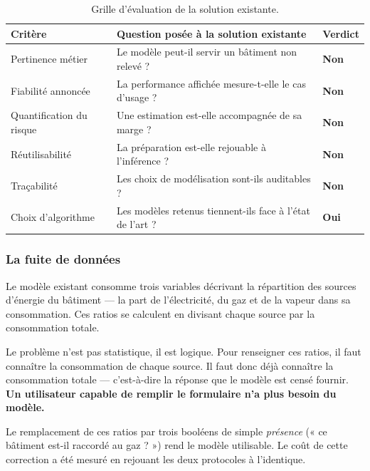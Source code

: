 \begin{table}[H]
\centering
\small
\begin{tabularx}{\linewidth}{@{}L{3.4cm}XL{2.5cm}@{}}
\toprule
\textbf{Critère} & \textbf{Question posée à la solution existante} & \textbf{Verdict} \\
\midrule
Pertinence métier & Le modèle peut-il servir un bâtiment non relevé ? & \textbf{Non} \\
Fiabilité annoncée & La performance affichée mesure-t-elle le cas d'usage ? & \textbf{Non} \\
Quantification du risque & Une estimation est-elle accompagnée de sa marge ? & \textbf{Non} \\
Réutilisabilité & La préparation est-elle rejouable à l'inférence ? & \textbf{Non} \\
Traçabilité & Les choix de modélisation sont-ils auditables ? & \textbf{Non} \\
Choix d'algorithme & Les modèles retenus tiennent-ils face à l'état de l'art ? & \textbf{Oui} \\
\bottomrule
\end{tabularx}
\caption{Grille d'évaluation de la solution existante.}
\end{table}

\subsubsection{La fuite de données}
\label{sec:fuite}

Le modèle existant consomme trois variables décrivant la répartition des sources
d'énergie du bâtiment — la part de l'électricité, du gaz et de la vapeur dans sa
consommation. Ces ratios se calculent en divisant chaque source par la
consommation totale.

\begin{constat}{Le problème n'est pas statistique, il est logique.}
Pour renseigner ces ratios, il faut connaître la consommation de chaque source.
Il faut donc déjà connaître la consommation totale — c'est-à-dire la réponse que
le modèle est censé fournir. \textbf{Un utilisateur capable de remplir le
formulaire n'a plus besoin du modèle.}
\end{constat}

Le remplacement de ces ratios par trois booléens de simple \emph{présence}
(« ce bâtiment est-il raccordé au gaz ? ») rend le modèle utilisable. Le coût de
cette correction a été mesuré en rejouant les deux protocoles à l'identique.

